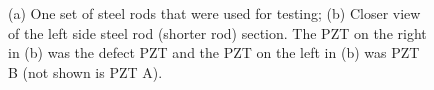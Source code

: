 \begin{figure}
\begin{subfigmatrix}{2}
\end{subfigmatrix}

   \caption
   { \label{fig:steelTR}
(a) One set of steel rods that were used for testing;
(b) Closer view of the left side steel rod (shorter rod) section. The PZT on the right in (b) was the defect PZT and the PZT on the left in (b) was PZT B (not shown is PZT A).
 }
   \end{figure}
   
